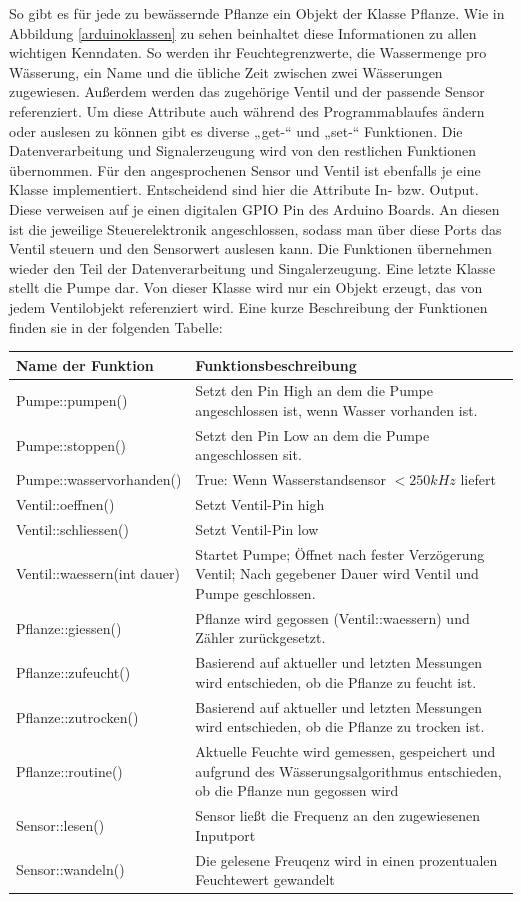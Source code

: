 So gibt es für jede zu bewässernde Pflanze ein Objekt der Klasse Pflanze. Wie in
Abbildung \ref{arduinoklassen} zu sehen beinhaltet diese Informationen zu allen wichtigen Kenndaten.
So werden ihr Feuchtegrenzwerte, die Wassermenge pro Wässerung, ein Name und die
übliche Zeit zwischen zwei Wässerungen zugewiesen. Außerdem werden das zugehörige
Ventil und der passende Sensor referenziert. Um diese Attribute auch während des
Programmablaufes ändern oder auslesen zu können gibt es diverse „get-“ und „set-“
Funktionen.  Die Datenverarbeitung und Signalerzeugung wird von den restlichen
Funktionen übernommen.
Für den angesprochenen Sensor und Ventil ist ebenfalls je eine Klasse implementiert.
Entscheidend sind hier die Attribute In- bzw. Output. Diese verweisen auf je einen
digitalen GPIO Pin des Arduino Boards. An diesen ist die jeweilige Steuerelektronik
angeschlossen, sodass man über diese Ports das Ventil steuern und den Sensorwert
auslesen kann. Die Funktionen übernehmen wieder den Teil der Datenverarbeitung und
Singalerzeugung. Eine letzte Klasse stellt die Pumpe dar. Von dieser Klasse wird nur
ein Objekt erzeugt, das von jedem Ventilobjekt referenziert wird. Eine kurze
Beschreibung der Funktionen finden sie in der folgenden Tabelle:
\begin{tabular}{|l|p{}|}
    \hline
    Name der Funktion &	Funktionsbeschreibung\\ \hline
    Pumpe::pumpen() &	Setzt den Pin High an dem die Pumpe angeschlossen ist, wenn Wasser vorhanden ist.\\ \hline
    Pumpe::stoppen() &	Setzt den Pin Low an dem die Pumpe angeschlossen sit.\\ \hline
    Pumpe::wasservorhanden() &	True: Wenn Wasserstandsensor $< 250kHz$ liefert\\ \hline
    Ventil::oeffnen() &	Setzt Ventil-Pin high\\ \hline
    Ventil::schliessen() &	Setzt Ventil-Pin low\\ \hline
    Ventil::waessern(int dauer) & Startet Pumpe; Öffnet nach fester Verzögerung Ventil; Nach gegebener Dauer wird Ventil und Pumpe geschlossen.\\ \hline
    Pflanze::giessen() &	Pflanze wird gegossen (Ventil::waessern) und Zähler zurückgesetzt.\\ \hline
    Pflanze::zufeucht() &	Basierend auf aktueller und letzten Messungen wird entschieden, ob die Pflanze zu feucht ist.\\ \hline
    Pflanze::zutrocken() &	Basierend auf aktueller und letzten Messungen wird entschieden, ob die Pflanze zu trocken ist.\\ \hline
    Pflanze::routine() &	Aktuelle Feuchte wird gemessen, gespeichert und aufgrund des Wässerungsalgorithmus entschieden, ob die Pflanze nun gegossen wird\\ \hline
    Sensor::lesen() &	Sensor ließt die Frequenz an den zugewiesenen Inputport\\ \hline
    Sensor::wandeln() &	Die gelesene Freuqenz wird in einen prozentualen Feuchtewert gewandelt\\ \hline
\end{tabular}


